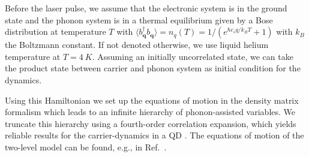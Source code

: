 \documentclass[aps,prl,reprint,superscriptaddress]{revtex4-1}
\begin{document}
Before the laser pulse, we assume that the electronic system is in the
ground state and the phonon system is in a thermal equilibrium given by
a Bose distribution at temperature $T$ with $\langle
b^\dag_{\mathbf{q}}b_{\mathbf{q}} \rangle = n_q(T) = 1/(e^{\hbar c_s
q/k_B T}+1)$  with $k_B$ the Boltzmann constant. If not denoted
otherwise, we use liquid helium temperature at $T=4~K$. Assuming an
initially uncorrelated state, we can take the product state between
carrier and phonon system as initial condition for the dynamics.

Using this Hamiltonian we set up the equations of motion in the density matrix formalism which leads to an infinite hierarchy of phonon-assisted variables. We truncate this hierarchy using a fourth-order correlation expansion, which yields reliable results for the carrier-dynamics in a QD \cite{Reiter2014,Luker2012,glassl2011lon}. The equations of motion of the two-level model can be found, e.g., in Ref.~\cite{krugel2006bac}. 


%

%
\end{document}
